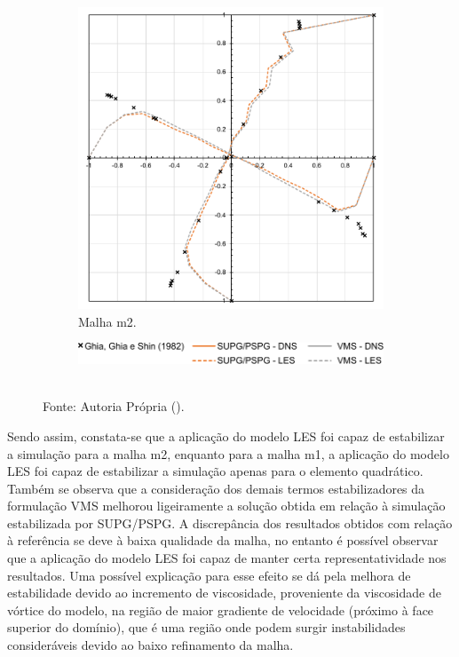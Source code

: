 \begin{figure}[h!]
\begin{subfigure}{0.49\textwidth}
        \includegraphics[width=\linewidth]{Figuras/Cavity/res-m2.pdf}
        \caption{Malha m2.}
    \end{subfigure}
    \begin{subfigure}{0.4\textwidth}
        \includegraphics[width=\linewidth]{Figuras/Cavity/legenda-m1m2.pdf}
    \end{subfigure}
    \\Fonte: Autoria Própria (\the\year).
    \label{fig:cavity-results3}
\end{figure}

Sendo assim, constata-se que a aplicação do modelo LES foi capaz de estabilizar a simulação para a malha m2, enquanto para a malha m1, a aplicação do modelo LES foi capaz de estabilizar a simulação apenas para o elemento quadrático. Também se observa que a consideração dos demais termos estabilizadores da formulação VMS melhorou ligeiramente a solução obtida em relação à simulação estabilizada por SUPG/PSPG. A discrepância dos resultados obtidos com relação à referência se deve à baixa qualidade da malha, no entanto é possível observar que a aplicação do modelo LES foi capaz de manter certa representatividade nos resultados. Uma possível explicação para esse efeito se dá pela melhora de estabilidade devido ao incremento de viscosidade, proveniente da viscosidade de vórtice do modelo, na região de maior gradiente de velocidade (próximo à face superior do domínio), que é uma região onde podem surgir instabilidades consideráveis devido ao baixo refinamento da malha.

